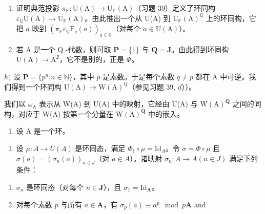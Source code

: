 \begin{enumerate}
\def\labelenumi{\alph{enumi})}
\setcounter{enumi}{5}
\item
  证明典范投影 \(\pi_{\mathbb{P}}: \mathrm{U}(\mathrm{A}) \to \mathrm{U}_{\mathbb{P}}(\mathrm{A})\)（习题 39）定义了环同构 \(\varepsilon_{\mathbb{Q}} \mathrm{U}(\mathrm{A}) \to \mathrm{U}_{\mathbb{P}}(\mathrm{A})\)。由此推出一个从 U(A) 到 \(\mathrm{U}_{\mathbb{P}}(\mathrm{A})^{\mathbb{Q}}\) 上的环同构，它把 \(a\) 映到 \((\pi_{\mathbb{P}} \varepsilon_{\mathbb{Q}} \mathrm{F}_{q}(a))_{q \in \mathbb{Q}}\)（对每个 \(a \in \mathrm{U}(\mathrm{A})\)）。
\item
  若 A 是一个 Q -代数，则可取 \(\mathbf{P} = \{1\}\) 与 \(\mathbf{Q} = \mathbf{J}\)。由此得到环同构 \(\mathrm{U}(\mathrm{A}) \to \mathrm{A}^{\mathbf{J}}\)，它不是别的，正是 \(\Phi\)。
\end{enumerate}

  \(h)\) 设 \(\mathbf{P} = \{p^n | n \in \mathbb{N}\}\)，其中 \(p\) 是素数。于是每个素数 \(q \neq p\) 都在 A 中可逆。我们得到一个环同构 \(\mathrm{U(A)} \to \mathrm{W(A)}^{\mathrm{Q}}\)（参见习题 39, \(d\)））。

我们以 \(\omega_{\mathrm{A}}\) 表示从 W(A) 到 U(A) 中的映射，它经由 U(A) 与 \(\mathrm{W(A)}^{\mathbf{Q}}\) 之间的同构，对应于 W(A) 按第一个分量在 \(\mathrm{W(A)}^{\mathbf{Q}}\) 中的嵌入。

\begin{enumerate}
\def\labelenumi{\arabic{enumi})}
\setcounter{enumi}{40}
\tightlist
\item
  设 A 是一个环。
\end{enumerate}

\begin{enumerate}
\def\labelenumi{\alph{enumi})}
\tightlist
\item
  设 \(\mu: A \to U(A)\) 是环同态，满足 \(\Phi_1 \circ \mu = \text{Id}_A\)。令 \(\sigma = \Phi \circ \mu\) 且 \(\sigma(a) = (\sigma_n(a))_{n \in J}\)（对 \(a \in A\)）。诸映射 \(\sigma_n: A \to A (n \in J)\) 满足下列条件：
\end{enumerate}

\begin{enumerate}
\def\labelenumi{(\arabic{enumi})}
\item
  \(\sigma_{n}\) 是环同态（对每个 \(n\in\mathbf{J}\)），且 \(\sigma_{1}=\mathrm{Id}_{\mathbf{A}}\)。
\item
  对每个素数 \(p\) 与所有 \(a \in \mathbf{A}\)，有 \(\sigma_p(a) \equiv a^p \mod p\mathbf{A}\) and
\end{enumerate}

